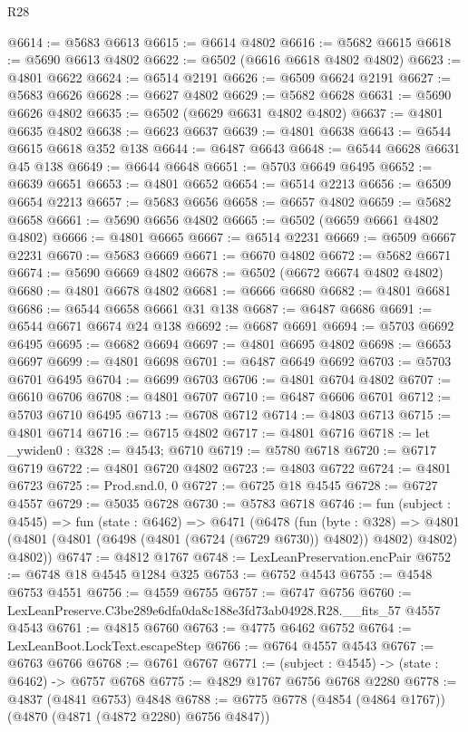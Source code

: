 \begin{lexlean}{R28}
\begin{coremodule}
@6614 := @5683 @6613
@6615 := @6614 @4802
@6616 := @5682 @6615
@6618 := @5690 @6613 @4802
@6622 := @6502 (@6616 @6618 @4802 @4802)
@6623 := @4801 @6622
@6624 := @6514 @2191
@6626 := @6509 @6624 @2191
@6627 := @5683 @6626
@6628 := @6627 @4802
@6629 := @5682 @6628
@6631 := @5690 @6626 @4802
@6635 := @6502 (@6629 @6631 @4802 @4802)
@6637 := @4801 @6635 @4802
@6638 := @6623 @6637
@6639 := @4801 @6638
@6643 := @6544 @6615 @6618 @352 @138
@6644 := @6487 @6643
@6648 := @6544 @6628 @6631 @45 @138
@6649 := @6644 @6648
@6651 := @5703 @6649 @6495
@6652 := @6639 @6651
@6653 := @4801 @6652
@6654 := @6514 @2213
@6656 := @6509 @6654 @2213
@6657 := @5683 @6656
@6658 := @6657 @4802
@6659 := @5682 @6658
@6661 := @5690 @6656 @4802
@6665 := @6502 (@6659 @6661 @4802 @4802)
@6666 := @4801 @6665
@6667 := @6514 @2231
@6669 := @6509 @6667 @2231
@6670 := @5683 @6669
@6671 := @6670 @4802
@6672 := @5682 @6671
@6674 := @5690 @6669 @4802
@6678 := @6502 (@6672 @6674 @4802 @4802)
@6680 := @4801 @6678 @4802
@6681 := @6666 @6680
@6682 := @4801 @6681
@6686 := @6544 @6658 @6661 @31 @138
@6687 := @6487 @6686
@6691 := @6544 @6671 @6674 @24 @138
@6692 := @6687 @6691
@6694 := @5703 @6692 @6495
@6695 := @6682 @6694
@6697 := @4801 @6695 @4802
@6698 := @6653 @6697
@6699 := @4801 @6698
@6701 := @6487 @6649 @6692
@6703 := @5703 @6701 @6495
@6704 := @6699 @6703
@6706 := @4801 @6704 @4802
@6707 := @6610 @6706
@6708 := @4801 @6707
@6710 := @6487 @6606 @6701
@6712 := @5703 @6710 @6495
@6713 := @6708 @6712
@6714 := @4803 @6713
@6715 := @4801 @6714
@6716 := @6715 @4802
@6717 := @4801 @6716
@6718 := let _ywiden0 : @328 := @4543; @6710
@6719 := @5780 @6718
@6720 := @6717 @6719
@6722 := @4801 @6720 @4802
@6723 := @4803 @6722
@6724 := @4801 @6723
@6725 := Prod.snd.{0, 0}
@6727 := @6725 @18 @4545
@6728 := @6727 @4557
@6729 := @5035 @6728
@6730 := @5783 @6718
@6746 := fun (subject : @4545) =>
  fun (state : @6462) =>
  @6471
    (@6478
      (fun (byte : @328) =>
      @4801 (@4801 (@4801 (@6498 (@4801 (@6724 (@6729 @6730)) @4802)) @4802) @4802) @4802))
@6747 := @4812 @1767
@6748 := LexLeanPreservation.encPair
@6752 := @6748 @18 @4545 @1284 @325
@6753 := @6752 @4543
@6755 := @4548 @6753 @4551
@6756 := @4559 @6755
@6757 := @6747 @6756
@6760 := LexLeanPreserve.C3be289e6dfa0da8c188e3fd73ab04928.R28.__fits_57 @4557 @4543
@6761 := @4815 @6760
@6763 := @4775 @6462 @6752
@6764 := LexLeanBoot.LockText.escapeStep
@6766 := @6764 @4557 @4543
@6767 := @6763 @6766
@6768 := @6761 @6767
@6771 := (subject : @4545) -> (state : @6462) -> @6757 @6768
@6775 := @4829 @1767 @6756 @6768 @2280
@6778 := @4837 (@4841 @6753) @4848
@6788 := @6775 @6778 (@4854 (@4864 @1767)) (@4870 (@4871 (@4872 @2280) @6756 @4847))

\end{coremodule}
\end{lexlean}
